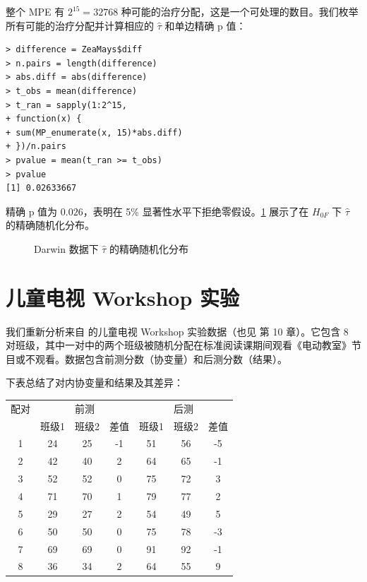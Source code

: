 整个 MPE 有 $2^{15} = 32768$ 种可能的治疗分配，这是一个可处理的数目。我们枚举所有可能的治疗分配并计算相应的 $\hat\tau$ 和单边精确 p 值：

\begin{verbatim}
> difference = ZeaMays$diff
> n.pairs = length(difference)
> abs.diff = abs(difference)
> t_obs = mean(difference)
> t_ran = sapply(1:2^15,
+ function(x) {
+ sum(MP_enumerate(x, 15)*abs.diff)
+ })/n.pairs
> pvalue = mean(t_ran >= t_obs)
> pvalue
[1] 0.02633667
\end{verbatim}

精确 p 值为 $0.026$，表明在 5\% 显著性水平下拒绝零假设。\cref{fig:7-randomization-dist} 展示了在 $H_{0F}$ 下 $\hat\tau$ 的精确随机化分布。

\begin{figure}[htbp]
\centering
\caption{Darwin 数据下 $\hat\tau$ 的精确随机化分布}
\label{fig:7-randomization-dist}
\end{figure}

\section{儿童电视 Workshop 实验}\label{sec:7-example-ctw}

我们重新分析来自 \citet{Ball:1973} 的儿童电视 Workshop 实验数据（也见 \citealp{ImbensRubin:2015} 第 10 章）。它包含 8 对班级，其中一对中的两个班级被随机分配在标准阅读课期间观看《电动教室》节目或不观看。数据包含前测分数（协变量）和后测分数（结果）。

下表总结了对内协变量和结果及其差异：

\begin{center}
\begin{tabular}{c|ccc|ccc}
配对 & \multicolumn{3}{c}{前测} & \multicolumn{3}{c}{后测} \\
 & 班级1 & 班级2 & 差值 & 班级1 & 班级2 & 差值 \\ \hline
1 & 24 & 25 & -1 & 51 & 56 & -5 \\
2 & 42 & 40 & 2 & 64 & 65 & -1 \\
3 & 52 & 52 & 0 & 75 & 72 & 3 \\
4 & 71 & 70 & 1 & 79 & 77 & 2 \\
5 & 29 & 27 & 2 & 54 & 49 & 5 \\
6 & 50 & 50 & 0 & 75 & 78 & -3 \\
7 & 69 & 69 & 0 & 91 & 92 & -1 \\
8 & 36 & 34 & 2 & 64 & 55 & 9
\end{tabular}
\end{center}

